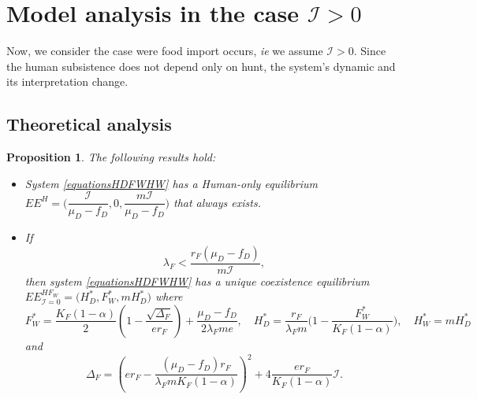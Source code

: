 \documentclass{article}
\newcommand{\lfw}{\lambda_{F}}
\newcommand{\lfw}{\lambda_{F}}
\newcommand{\cI}{\mathcal{I}}
\newtheorem{prop}{Proposition}
\begin{document}
\section{Model analysis in the case $\cI > 0$}
Now, we consider the case were food import occurs, \textit{ie} we assume $\cI > 0$. Since the human subsistence does not depend only on hunt, the system's dynamic and its interpretation change.


\subsection{Theoretical analysis}
\begin{prop}
The following results hold:
\begin{itemize}
\item System \eqref{equationsHDFWHW} has a Human-only equilibrium $EE^{H} = \Big(\dfrac{\cI}{\mu_D - f_D}, 0, \dfrac{m \cI}{\mu_D - f_D} \Big)$ that always exists.
\item If $$ \lfw < \dfrac{r_F (\mu_D -f_D)}{m \cI},$$ then system \eqref{equationsHDFWHW} has a unique coexistence equilibrium $EE^{HF_W}_{\cI = 0} = \Big(H^*_{D}, F^*_{W}, m H^*_{D} \Big)$
where
$$F^*_{W} = \dfrac{K_F(1-\alpha)}{2}\left(1 - \dfrac{\sqrt{\Delta_F}}{er_F}\right) + \dfrac{\mu_D - f_D}{2\lfw m e},\quad
H^*_{D} = \dfrac{r_F}{\lfw m} \Big(1 - \dfrac{F^*_{W}}{K_F(1-\alpha)} \Big),
\quad 
H^*_{W} = m H^*_{D}$$
and
$$
\Delta_F = \left(er_F - \dfrac{(\mu_D - f_D) r_F}{\lfw m K_F(1-\alpha)} \right)^2 + 4\dfrac{er_F}{K_F(1-\alpha)}  \cI.
$$
\end{itemize} 
\end{prop}
\end{document}
